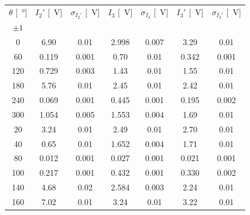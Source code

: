 \documentclass[10pt,oneside,a4paper]{article}
\begin{document}
\begin{center}
\vspace*{0.4cm}
\centering
\begin{tabular}{c|c|c|c|c|c|c}
\toprule
$\theta$ [\SI{}{\degree}] & $I_2'$ [\SI{}{V}] & $\sigma_{I_2'}$ [\SI{}{V}] & $I_3$ [\SI{}{V}] & $\sigma_{I_3}$ [\SI{}{V}] & $I_3'$ [\SI{}{V}] & $\sigma_{I_3'}$ [\SI{}{V}] \\
$\pm 1$ & & & & & & \\
\midrule
  0  & 6.90 & 0.01 & 2.998 & 0.007 & 3.29 & 0.01 \\
  60 & 0.119 & 0.001 & 0.70 & 0.01 & 0.342 & 0.001 \\
 120 & 0.729 & 0.003 & 1.43 & 0.01 & 1.55 & 0.01 \\
 180 & 5.76 & 0.01 & 2.45 & 0.01 & 2.42 & 0.01 \\
 240 & 0.069 & 0.001 & 0.445 & 0.001 & 0.195 & 0.002 \\
 300 & 1.054 & 0.005 & 1.553 & 0.004 & 1.69 & 0.01 \\
  20 & 3.24 & 0.01 & 2.49 & 0.01 & 2.70 & 0.01 \\
  40 & 0.65 & 0.01 & 1.652 & 0.004 & 1.71 & 0.01 \\
  80 & 0.012 & 0.001 & 0.027 & 0.001 & 0.021 & 0.001 \\
 100 & 0.217 & 0.001 & 0.432 & 0.001 & 0.330 & 0.002 \\
 140 & 4.68 & 0.02 & 2.584 & 0.003 & 2.24 & 0.01 \\
 160 & 7.02 & 0.01 & 3.24 & 0.01 & 3.22 & 0.01 \\
 \bottomrule
\end{tabular}
\end{center}
\end{document}
